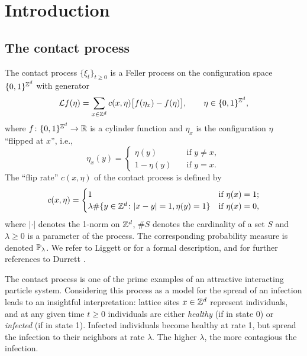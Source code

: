 
\section{Introduction}
\subsection{The contact process}
The contact process $\{\xi_t\}_{t \ge 0}$ is a Feller process on the configuration space $\{0,1\}^\Zd$ with generator
\begin{equation}
	\mathcal Lf(\eta)=\sum_{x\in\Zd}c(x,\eta)\big[f(\eta_x)-f(\eta)\big],
	\qquad \eta\in\{0,1\}^\Zd, 
\end{equation}
where $f\colon\{0, 1\}^\Zd \to \R$ is a cylinder function and $\eta_x$ is the configuration $\eta$ ``flipped at $x$'', i.e., 
\[ \eta_x(y)=\begin{cases}\eta(y)\quad&\text{if }y\neq x,\\ 1-\eta(y)\quad&\text{if }y=x.\end{cases}\] 
The ``flip rate'' $c(x,\eta)$ of the contact process is defined by 
\begin{equation}\label{eqFlipRateDef}
	c(x,\eta)=
	\begin{cases} 
		1&\text{if }\eta(x) = 1;\\
		\lambda \#\{y\in\Zd\colon|x - y| = 1, \eta(y) = 1\}&\text{if }\eta(x) = 0,
	\end{cases}
\end{equation}
where $|\cdot|$ denotes the 1-norm on $\Zd$, $\#S$ denotes the cardinality of a set $S$ and $\lambda \ge 0$ is a parameter of the process. 
The corresponding probability measure is denoted $\P_\lambda$. 
We refer to Liggett \cite[Chapter VI]{Ligge85} or \cite[Part I]{Ligge99} for a formal description, and for further references to Durrett \cite{Durre91}. 

The contact process is one of the prime examples of an attractive interacting particle system. Considering this process as a model for the spread of an infection leads to an insightful interpretation: lattice sites $x\in\Zd$ represent individuals, and at any given time $t\ge0$ individuals are either \emph{healthy} (if in state 0) or \emph{infected} (if in state 1). Infected individuals become healthy at rate 1, but spread the infection to their neighbors at rate $\lambda$. The higher $\lambda$, the more contagious the infection. 

